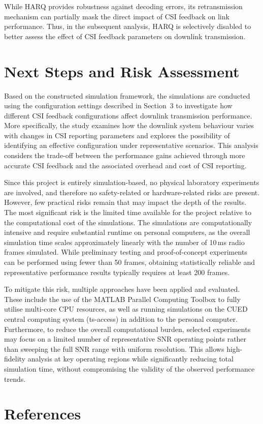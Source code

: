 \documentclass[a4paper,12pt,onecolumn]{article}
\begin{document}
While HARQ provides robustness against decoding errors, its retransmission mechanism can partially mask the direct impact of CSI feedback on link performance. Thus, in the subsequent analysis, HARQ is selectively disabled to better assess the effect of CSI feedback parameters on downlink transmission.

	
	
	\section{Next Steps and Risk Assessment}
Based on the constructed simulation framework, the simulations are conducted using the configuration settings described in Section~3 to investigate how different CSI feedback configurations affect downlink transmission performance. More specifically, the study examines how the downlink system behaviour varies with changes in CSI reporting parameters and explores the possibility of identifying an effective configuration under representative scenarios. This analysis considers the trade-off between the performance gains achieved through more accurate CSI feedback and the associated overhead and cost of CSI reporting.

Since this project is entirely simulation-based, no physical laboratory experiments are involved, and therefore no safety-related or hardware-related risks are present. However, few practical risks remain that may impact the depth of the results. The most significant risk is the limited time available for the project relative to the computational cost of the simulations. The simulations are computationally intensive and require substantial runtime on personal computers, as the overall simulation time scales approximately linearly with the number of 10\,ms radio frames simulated. While preliminary testing and proof-of-concept experiments can be performed using fewer than 50 frames, obtaining statistically reliable and representative performance results typically requires at least 200 frames.

To mitigate this risk, multiple approaches have been applied and evaluated. These include the use of the MATLAB Parallel Computing Toolbox to fully utilise multi-core CPU resources, as well as running simulations on the CUED central computing system (ts-access) in addition to the personal computer. Furthermore, to reduce the overall computational burden, selected experiments may focus on a limited number of representative SNR operating points rather than sweeping the full SNR range with uniform resolution. This allows high-fidelity analysis at key operating regions while significantly reducing total simulation time, without compromising the validity of the observed performance trends.

	\vspace*{-0.5cm}
	\section{References} \let\refname\relax
	\vspace*{-1cm}
	\begingroup
	\scriptsize
	
\endgroup
	
\end{document}
